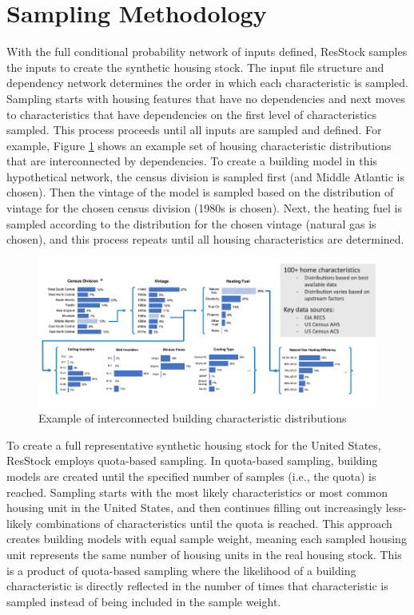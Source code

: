 \section{Sampling Methodology} \label{sec:sampling_methodology}
 With the full conditional probability network of inputs defined, ResStock samples the inputs to create the synthetic housing stock. The input file structure and dependency network determines the order in which each characteristic is sampled. Sampling starts with housing features that have no dependencies and next moves to characteristics that have dependencies on the first level of characteristics sampled. This process proceeds until all inputs are sampled and defined. For example, Figure \ref{fig:ex_build_char_distrs} shows an example set of housing characteristic distributions that are interconnected by dependencies. To create a building model in this hypothetical network, the census division is sampled first (and Middle Atlantic is chosen). Then the vintage of the model is sampled based on the distribution of vintage for the chosen census division (1980s is chosen). Next, the heating fuel is sampled according to the distribution for the chosen vintage (natural gas is chosen), and this process repeats until all housing characteristics are determined.  

\begin{figure}
    \centering
    \includegraphics[width=1\linewidth]{images/cond_prob.png}
    \caption{Example of interconnected building characteristic distributions}
    \label{fig:ex_build_char_distrs}
\end{figure}

To create a full representative synthetic housing stock for the United States, ResStock employs quota-based sampling. In quota-based sampling, building models are created until the specified number of samples (i.e., the quota) is reached. Sampling starts with the most likely characteristics or most common housing unit in the United States, and then continues filling out increasingly less-likely combinations of characteristics until the quota is reached. This approach creates building models with equal sample weight, meaning each sampled housing unit represents the same number of housing units in the real housing stock. This is a product of quota-based sampling where the likelihood of a building characteristic is directly reflected in the number of times that characteristic is sampled instead of being included in the sample weight.


